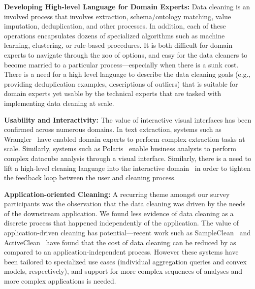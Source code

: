 

\noindent\textbf{Developing High-level Language for Domain Experts:} Data cleaning is an involved process that involves extraction, schema/ontology matching, value imputation, deduplication, and other processes.  In addition, each of these operations encapsulates dozens of specialized algorithms such as machine learning, clustering, or rule-based procedures.  It is both difficult for domain experts to navigate through the zoo of options, and easy for the data cleaners to become married to a particular process---especially when there is a sunk cost.  There is a need for a high level language to describe the data cleaning goals (e.g., providing deduplication examples, descriptions of outliers) that is suitable for domain experts yet usable by the technical experts that are tasked with implementing data cleaning at scale. {\color{red}{more details?}}


\noindent\textbf{Usability and Interactivity:} The value of interactive visual interfaces has been confirmed across numerous domains.  In text extraction, systems such as Wrangler~\cite{kandel2011wrangler} have enabled domain experts to perform complex extraction tasks at scale.  Similarly, systems such as Polaris~\cite{stolte2002polaris} enable business analysts to perform complex datacube analysis through a visual interface.  Similarly, there is a need to lift a high-level cleaning language into the interactive domain~\cite{heer2015predictive} in order to tighten the feedback loop between the user and cleaning process.

% 

\noindent\textbf{Application-oriented Cleaning:}  A recurring theme amongst our survey participants was the observation that the data cleaning was driven by the needs of the downstream application.  We found less evidence of data cleaning as a discrete process that happened independently of the application.  The value of application-driven cleaning has potential---recent work such as SampleClean~\cite{DBLP:journals/debu/KrishnanWFGKM015} and ActiveClean~\cite{activecleanarxiv} have found that the cost of data cleaning can be reduced by {\color{red}{an order of magnitude or more}} as compared to an application-independent process.   However these systems have been tailored to specialized use cases (individual aggregation queries and convex models, respectively), and support for more complex sequences of analyses and more complex applications is needed.

